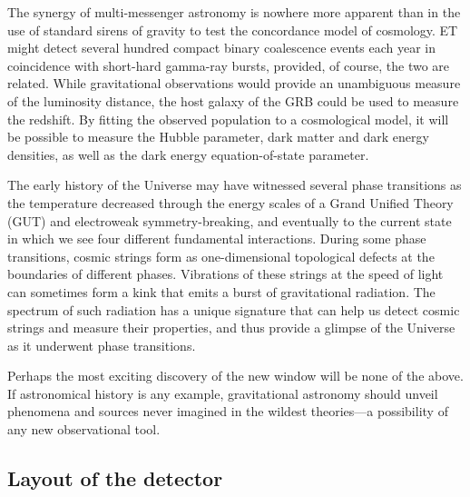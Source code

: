 The synergy of multi-messenger astronomy is nowhere more
apparent than in the use of standard sirens of gravity to
test the concordance model of cosmology.  ET might detect
several hundred compact binary coalescence events each year
in coincidence with short-hard gamma-ray bursts, provided, of
course, the two are related.  While gravitational observations would
provide an unambiguous measure of the luminosity distance,
the host galaxy of the GRB could be used to measure the
redshift. By fitting the observed population to a cosmological
model, it will be possible to measure the Hubble parameter,
dark matter and dark energy densities, as well as the
dark energy equation-of-state parameter.

The early history of the Universe may have witnessed
several phase transitions as the temperature decreased
through the energy scales of a Grand Unified Theory (GUT)
and electroweak symmetry-breaking, and eventually to the
current state in which we see four different fundamental
interactions. During some phase transitions, cosmic strings
form as one-dimensional topological defects at the
boundaries of different phases. Vibrations of these strings
at the speed of light can sometimes form a kink that emits a
burst of gravitational radiation. The spectrum of such radiation
has a unique signature that can help us detect cosmic strings
and measure their properties, and thus provide a glimpse of the
Universe as it underwent phase transitions.

Perhaps the most exciting discovery of the new window will
be none of the above. If astronomical history is any example,
gravitational astronomy should unveil phenomena and
sources never imagined in the wildest theories---a possibility
of any new observational tool.


\FloatBarrier
\newpage
\subsection{Layout of the detector}

